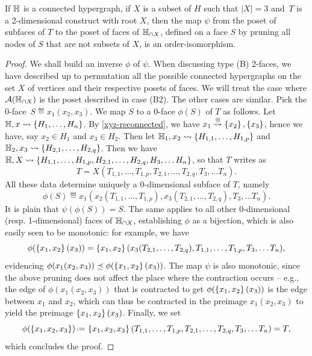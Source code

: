 \begin{lemma} 
  \label{instance-construct} 
  If ${\mathbb H}$ is a connected hypergraph, if $X$ is a subset of $H$ such that $|X|=3$ and~$T$ is a 2-dimensional construct with root $X$, then the map $\psi$ from the poset of subfaces of $T$ to the poset of faces of ${\mathbb H}_{\cap X}$, defined on a face $S$ by pruning all nodes of $S$ that are not subsets of $X$, is an order-isomorphism.
\end{lemma}

\begin{proof}
We shall build an inverse $\phi$ of $\psi$.
When discussing type (B) 2-faces, we have described up to permutation all the possible connected hypergraphs on the set $X$ of vertices and their respective posets of faces. 
We will treat the case where ${\cal A}({\mathbb H}_{\cap X})$ is the poset described in case (B2). The other cases are similar.
Pick the 0-face~$S\eqdef  x_1(x_2,x_3)$. 
We map $S$ to a $0$-face $\phi(S)$ of $T$ as follows. 
Let ${\mathbb H},x\leadsto \{H_1,\ldots,H_n\}$. 
By \cref{xyz-reconnected}, we have $x_1\stackrel{{\mathbb H}}{\rightsquigarrow}\left\{x_2\right\},\left\{x_3\right\}$, hence we have, say $x_2\in H_1$ and $x_3\in H_2$. Then let
  ${\mathbb H_1},x_2\leadsto \{H_{1,1},\ldots,H_{1,p}\}$ and ${\mathbb H_2},x_3\leadsto \{H_{2,1},\ldots,H_{2,q}\}$.
  Then we have ${\mathbb H},X\leadsto \{H_{1,1},\ldots,H_{1,p},H_{2,1},\ldots,H_{2,q},H_3,\ldots H_n\}$, so that $T$ writes as
  $$T= X(T_{1,1},\ldots,T_{1,p},T_{2,1},\ldots,T_{2,q},T_3,\ldots T_n).$$ 
All these data determine uniquely a 0-dimensional subface of $T$, namely
  $$\phi(S)\eqdef x_1(x_2(T_{1,1},\ldots,T_{1,p}),x_3(T_{2,1},\ldots,T_{2,q}),T_3,\ldots T_n).$$
It is plain that $\psi(\phi(S))=S$.
  The same applies to all other 0-dimensional (resp. 1-dimensional) faces of ${\mathbb H}_{\cap X}$, establishing $\phi$ as a bijection, which is also easily seen to be monotonic: for example, we have
 $$\phi(\left\{x_1,x_2\right\}(x_3))= \left\{x_1,x_2\right\}(x_3(T_{2,1},\ldots,T_{2,q}),T_{1,1},\ldots,T_{1,p},T_3,\ldots T_n),$$
 evidencing $\phi(x_1(x_2,x_3))\preceq \phi(\left\{x_1,x_2\right\}(x_3))$. 
 The map $\psi$ is also monotonic, since the above pruning does not affect the place where the contraction occurs -- e.g., the edge of $\phi(x_1(x_2,x_3))$ that is contracted to get $\phi(\left\{x_1,x_2\right\}(x_3))$ is the edge between $x_1$ and $x_2$, which can thus be contracted in the preimage $x_1(x_2,x_3)$ to yield the preimage $\left\{x_1,x_2\right\}(x_3)$.
 Finally, we set
 $$\phi(\set{x_1,x_2,x_3})\eqdef \set{x_1,x_2,x_3}(T_{1,1},\ldots,T_{1,p},T_{2,1},\ldots,T_{2,q},T_3,\ldots T_n)=T,$$
 which concludes the proof.
 \end{proof}

